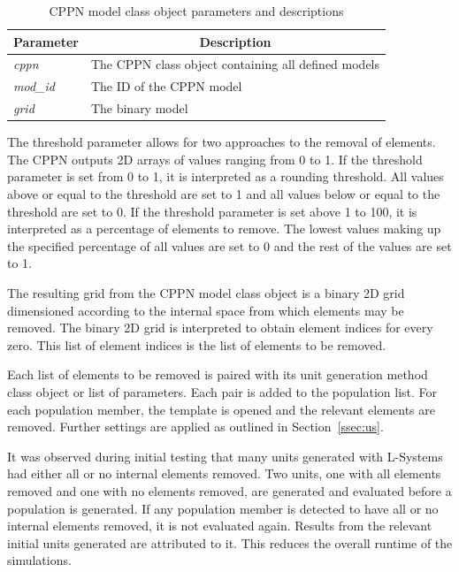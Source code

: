 \begin{table}[H]
\centering
\caption{CPPN model class object parameters and descriptions}
\label{tab:cpmodpardes}
\begin{tabular}{@{}ll@{}}
\toprule
\multicolumn{1}{c}{\textbf{Parameter}} & \multicolumn{1}{c}{\textbf{Description}}            \\ \midrule
\textit{cppn}                          & The CPPN class object containing all defined models \\
\textit{mod\_id}                       & The ID of the CPPN model                            \\
\textit{grid}                          & The binary model                                    \\ \bottomrule
\end{tabular}
\end{table}

The threshold parameter allows for two approaches to the removal of elements. The CPPN outputs 2D arrays of values ranging from 0 to 1. If the threshold parameter is set from 0 to 1, it is interpreted as a rounding threshold. All values above or equal to the threshold are set to 1 and all values below or equal to the threshold are set to 0. If the threshold parameter is set above 1 to 100, it is interpreted as a percentage of elements to remove. The lowest values making up the specified percentage of all values are set to 0 and the rest of the values are set to 1.

The resulting grid from the CPPN model class object is a binary 2D grid dimensioned according to the internal space from which elements may be removed. The binary 2D grid is interpreted to obtain element indices for every zero. This list of element indices is the list of elements to be removed.

Each list of elements to be removed is paired with its unit generation method class object or list of parameters. Each pair is added to the population list. For each population member, the template is opened and the relevant elements are removed. Further settings are applied as outlined in Section~\ref{ssec:us}.

It was observed during initial testing that many units generated with L-Systems had either all or no internal elements removed. Two units, one with all elements removed and one with no elements removed, are generated and evaluated before a population is generated. If any population member is detected to have all or no internal elements removed, it is not evaluated again. Results from the relevant initial units generated are attributed to it. This reduces the overall runtime of the simulations.

